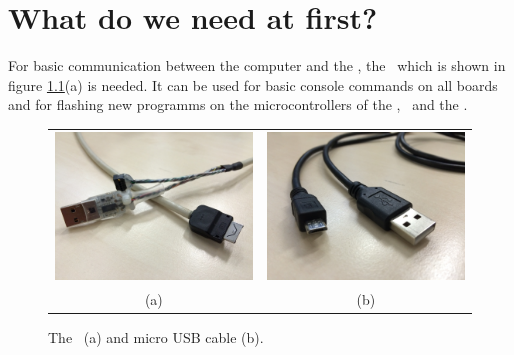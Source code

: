 \chapter{What do we need at first?}

For basic communication between the computer and the \amiro, the \progcable\ which is shown in figure \ref{fig:cables}(a) is needed. It can be used for basic console commands on all boards and for flashing new programms on the microcontrollers of the \diwheel, \power\ and the \light.

\begin{figure}[htb]
\begin{center}
\begin{tabular}{cc}
\includegraphics[scale=0.05]{Bilder/ProgCable.JPG} &
\includegraphics[scale=0.05]{Bilder/USBCable.JPG} \\
(a) & (b) \\
\end{tabular}
\caption{The \progcable\ (a) and micro USB cable (b).}
\label{fig:cables}
\end{center}
\end{figure}

